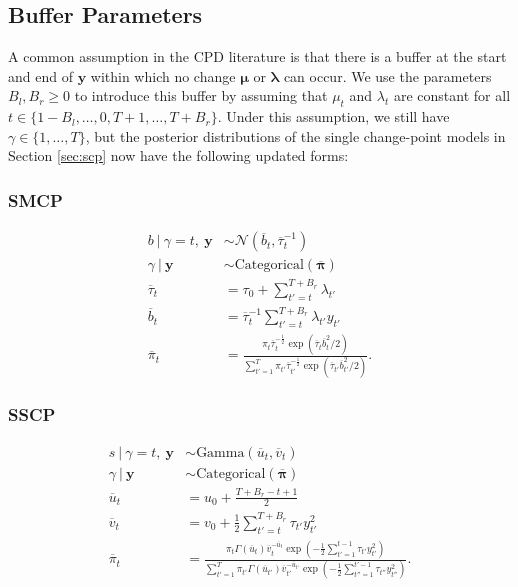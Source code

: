 \subsection{Buffer Parameters}
\label{app:buffer}

A common assumption in the CPD literature is that there is a buffer at the start and end of $\mathbf{y}$ within which no change $\pmb{\mu}$ or $\pmb{\lambda}$ can occur. We use the parameters $B_l,B_r \geq 0$ to introduce this buffer by assuming that $\mu_t$ and $\lambda_t$ are constant for all $t\in\{1-B_l,\ldots,0,T+1, \ldots, T+B_r\}$. Under this assumption, we still have $\gamma \in \{1,\ldots,T\}$, but the posterior distributions of the single change-point models in Section \ref{sec:scp} now have the following updated forms:

\subsubsection{SMCP}
\small
\begin{align*}
    b \:|\: \gamma = t, \: \mathbf{y} &\sim \mathcal{N}\left(\overline{b}_{t}, \overline{\tau}_{t}^{-1}\right) \\
    \gamma \:|\: \mathbf{y} &\sim \text{Categorical}(\overline{\pmb{\pi}}) \\
    \overline{\tau}_t &= \tau_0 + \sum_{t'=t}^{T+B_r} \lambda_{t'} \\
    \overline{b}_t &= \overline{\tau}^{-1}_t\sum_{t'=t}^{T+B_r} \lambda_{t'} y_{t'} \\
    \overline{\pi}_t &= \frac{\pi_t\overline{\tau}^{-\frac{1}{2}}_t\exp\left(\overline{\tau}_t\overline{b}^2_t / 2\right)}{\sum_{t'=1}^T \pi_{t'}\overline{\tau}^{-\frac{1}{2}}_{t'}\exp\left(\overline{\tau}_{t'}\overline{b}^2_{t'} / 2\right)}.
\end{align*}
\normalsize

\subsubsection{SSCP}
\small
\begin{align*}
    s \:|\: \gamma = t, \: \mathbf{y} &\sim \text{Gamma}\left(\overline{u}_{t}, \overline{v}_{t}\right)  \\
    \gamma \:|\: \mathbf{y}&\sim \text{Categorical}(\overline{\pmb{\pi}}) \\
    \overline{u}_{t} &= u_0 + \frac{T +B_r - t + 1}{2} \\
    \overline{v}_{t} &= v_0 + \frac{1}{2} \sum_{t'=t}^{T+B_r} \tau_{t'}y_{t'}^2 \\
    \overline{\pi}_t &= \frac{\pi_t \Gamma(\overline{u}_{t}) \overline{v}_{t}^{-\overline{u}_{t}}\exp\left(- \frac{1}{2}\sum_{t'=1}^{t-1} \tau_{t'}y_{t'}^2\right)}{\sum_{t'=1}^T \pi_{t'} \Gamma(\overline{u}_{t'}) \overline{v}_{t'}^{-\overline{u}_{t'}}\exp\left(- \frac{1}{2}\sum_{t''=1}^{t'-1} \tau_{t''}y_{t''}^2\right)}.
\end{align*}
\normalsize

